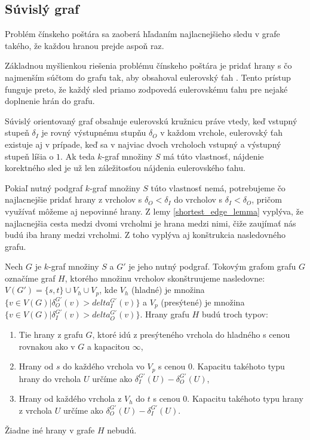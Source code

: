 \subsection{Súvislý graf}

Problém čínskeho poštára sa zaoberá hľadaním najlacnejšieho sledu v grafe takého, že
každou hranou prejde aspoň raz.

Základnou myšlienkou riešenia problému čínskeho poštára je pridať hrany s čo najmenším súčtom do grafu
tak, aby obsahoval eulerovský ťah \cite{chinesepostman}. Tento prístup funguje preto, že každý sled priamo
zodpovedá eulerovskému ťahu pre nejaké doplnenie hrán do grafu.

Súvislý orientovaný graf obsahuje eulerovskú kružnicu práve vtedy, keď vstupný stupeň $\delta_I$ je rovný
výstupnému stupňu $\delta_O$ v každom vrchole, eulerovský ťah existuje aj v prípade, keď sa v najviac
dvoch vrcholoch vstupný a výstupný stupeň líšia o $1$. Ak teda $k$-graf množiny $S$ má túto
vlastnosť, nájdenie korektného sled je už len záležitosťou nájdenia eulerovského ťahu.

Pokiaľ nutný podgraf $k$-graf množiny $S$ túto vlastnosť nemá, potrebujeme čo najlacnejšie pridať hrany z vrcholov s 
$\delta_O < \delta_I$ do vrcholov s $\delta_I < \delta_O$, pričom využívať môžeme aj nepovinné hrany.
Z lemy \ref{shortest_edge_lemma} vyplýva, že najlacnejšia cesta medzi dvomi vrcholmi je hrana medzi
nimi, čiže zaujímať nás budú iba hrany medzi vrcholmi. Z toho vyplýva aj konštrukcia nasledovného grafu.

\begin{defn}
    Nech $G$ je $k$-graf množiny $S$ a $G'$ je jeho nutný podgraf. Tokovým grafom grafu $G$
    označíme graf $H$, ktorého množinu vrcholov skonštruujeme nasledovne:
    $V(G') = \{s, t\} \cup V_h \cup V_p$, kde $V_h$ (hladné) je množina $\{ v \in V(G) | \delta_O^{G'}(v) > delta_I^{G'}(v) \}$
    a $V_p$ (presýtené) je množina $\{ v \in V(G) | \delta_I^{G'}(v) > delta_O^{G'}(v)\}$.
    Hrany grafu $H$ budú troch typov:
    \begin{enumerate}
        \item Tie hrany z grafu $G$, ktoré idú z presýteného vrchola do hladného s cenou rovnakou ako v $G$ a kapacitou $\infty$,
        \item Hrany od $s$ do každého vrchola vo $V_p$ s cenou $0$. Kapacitu takéhoto typu hrany do vrchola $U$ určíme ako $\delta_I^{G'}(U) - \delta_O^{G'}(U)$,
        \item Hrany od každého vrchola z $V_h$ do $t$ s cenou $0$. Kapacitu takéhoto typu hrany z vrchola $U$ určíme ako $\delta_O^{G'}(U) - \delta_I^{G'}(U)$.
    \end{enumerate}
    Žiadne iné hrany v grafe $H$ nebudú.
\end{defn}

